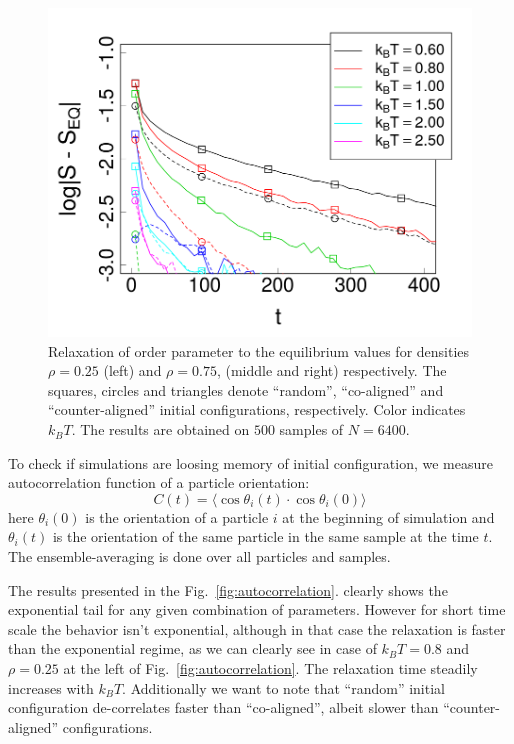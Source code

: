 \begin{figure}[t]
\begin{minipage}[c]{0.32\textwidth}
\end{minipage}
\begin{minipage}[c]{0.32\textwidth}
	\centering
	\includegraphics[width=\textwidth]{Images/relax_op_75_exp}
\end{minipage}
	\caption{Relaxation of order parameter to the equilibrium values for densities $\rho = 0.25$ (left) and $\rho = 0.75$, (middle and right) respectively. The squares, circles and triangles denote ``random'', ``co-aligned'' and ``counter-aligned'' initial configurations, respectively. Color indicates $k_BT$. The results are obtained on $500$ samples of $N = 6400$.}
	\label{fig:op_relaxation}
\end{figure}

To check if simulations are loosing memory of initial configuration, we measure autocorrelation function of a particle orientation:
\begin{equation}
\label{eq:autocorrelation_ld}
	C(t) = \langle\cos\theta_i(t) \cdot \cos\theta_i(0)\rangle
\end{equation}
here $\theta_i(0)$ is the orientation of a particle $i$ at the beginning of simulation and $\theta_i(t)$ is the orientation of the same particle in the same sample at the time $t$. The ensemble-averaging is done over all particles and samples.

The results presented in the Fig.~\ref{fig:autocorrelation}. clearly shows the exponential tail for any given combination of parameters. However for short time scale the behavior isn't exponential, although in that case the relaxation is faster than the exponential regime, as we can clearly see in case of $k_BT = 0.8$ and $\rho = 0.25$ at the left of Fig.~\ref{fig:autocorrelation}. The relaxation time steadily increases with $k_BT$. Additionally we want to note that ``random'' initial configuration de-correlates faster than ``co-aligned'', albeit slower than ``counter-aligned'' configurations.

